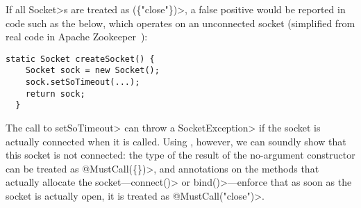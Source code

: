 If all \<Socket>s are treated as \MustCall\<(\{"close"\})>,
a false positive would be reported
in code such as the below, which operates on an unconnected socket
(simplified from real code in Apache Zookeeper~):

\begin{lstlisting}[frame=tb,belowskip=3mm]
  static Socket createSocket() {
    Socket sock = new Socket();
    sock.setSoTimeout(...);
    return sock;
  }
\end{lstlisting}

The call to \<setSoTimeout> can throw a \<SocketException> if the
socket is actually connected when it is called. Using \ResetMustCall,
however, we can soundly show that this socket is not connected:
the type of the result of the no-argument constructor can be
treated as \<@MustCall(\{\})>, and \ResetMustCall annotations
on the methods that actually allocate the socket---\<connect()> or
\<bind()>---enforce that as soon as the socket is actually open,
it is treated as \<@MustCall("close")>.

